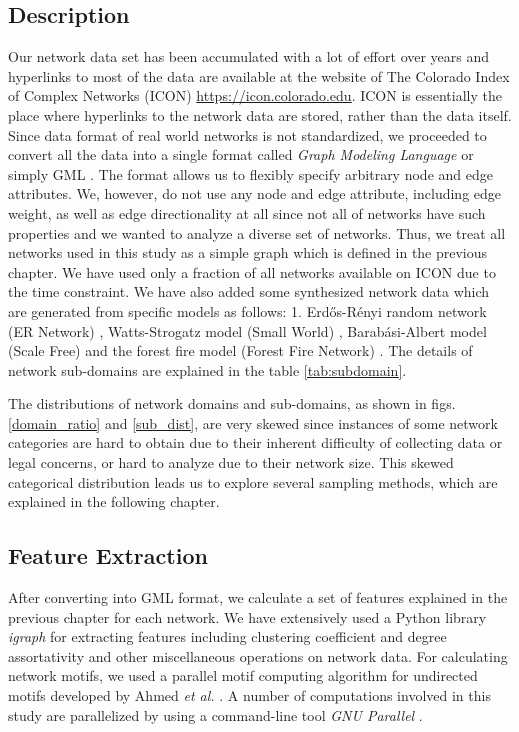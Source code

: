 \documentclass{article}
\begin{document}
	\subsection{Description}	
	Our network data set has been accumulated with a lot of effort over years and hyperlinks to most of the data are available at the website of The Colorado Index of Complex Networks (ICON) \url{https://icon.colorado.edu}. ICON is essentially the place where hyperlinks to the network data are stored, rather than the data itself.  
	Since data format of real world networks is not standardized, we proceeded to convert all the data into a single format called \textit{Graph Modeling Language} or simply GML \cite{GML}. The format allows us to flexibly specify arbitrary node and edge attributes. We, however, do not use any node and edge attribute, including edge weight, as well as edge directionality at all since not all of networks have such properties and we wanted to analyze a diverse set of networks. Thus, we treat all networks used in this study as a simple graph which is defined in the previous chapter. We have used only a fraction of all networks available on ICON due to the time constraint. We have also added some synthesized network data which are generated from specific models as follows: 1. Erd\H{o}s-R\'enyi random network (ER Network) \cite{ER_Network}, Watts-Strogatz model (Small World) \cite{watts1998cds}, Barab\'asi-Albert model (Scale Free) \cite{Barabasi99emergenceScaling} and the forest fire model (Forest Fire Network) \cite{ForestFire}. The details of network sub-domains are explained in the table \ref{tab:subdomain}.
	
	The distributions of network domains and sub-domains, as shown in figs.\ref{domain_ratio} and \ref{sub_dist}, are very skewed since instances of some network categories are hard to obtain due to their inherent difficulty of collecting data or legal concerns, or hard to analyze due to their network size. This skewed categorical distribution leads us to explore several sampling methods, which are explained in the following chapter. 
	\subsection{Feature Extraction}
	After converting into GML format, we calculate a set of features explained in the previous chapter for each network. We have extensively used a Python library \textit{igraph} \cite{igraph} for extracting features including clustering coefficient and degree assortativity and other miscellaneous operations on network data. For calculating network motifs, we used a parallel motif computing algorithm for undirected motifs developed by Ahmed \textit{et al.} \cite{ahmed2015icdm}. A number of computations involved in this study are parallelized by using a command-line tool \textit{GNU Parallel} \cite{GNUParallel}.
\end{document}
